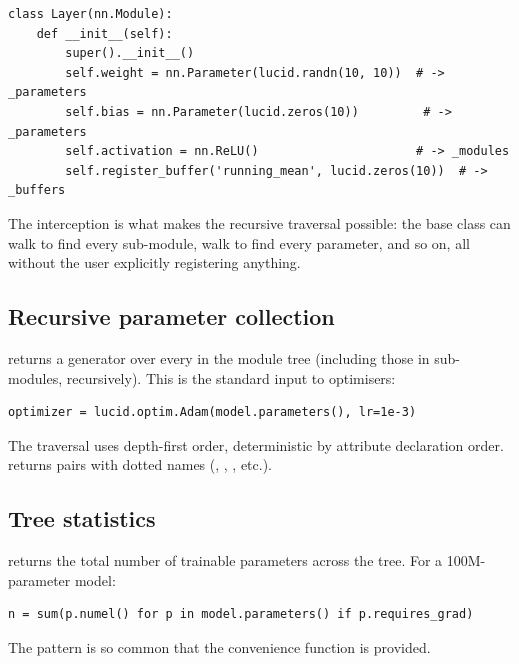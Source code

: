 \begin{lstlisting}[style=lucid,language=LucidPython]
class Layer(nn.Module):
    def __init__(self):
        super().__init__()
        self.weight = nn.Parameter(lucid.randn(10, 10))  # -> _parameters
        self.bias = nn.Parameter(lucid.zeros(10))         # -> _parameters
        self.activation = nn.ReLU()                      # -> _modules
        self.register_buffer('running_mean', lucid.zeros(10))  # -> _buffers
\end{lstlisting}

The interception is what makes the recursive traversal possible:
the base class can walk  to find every sub-module,
walk  to find every parameter, and so on, all
without the user explicitly registering anything.

\subsection{Recursive parameter collection}
\label{ssec:module_system:recursive_params}

 returns a generator over every
 in the module tree (including those in sub-modules,
recursively). This is the standard input to optimisers:

\begin{lstlisting}[style=lucid,language=LucidPython]
optimizer = lucid.optim.Adam(model.parameters(), lr=1e-3)
\end{lstlisting}

The traversal uses depth-first order, deterministic by attribute
declaration order.  returns
 pairs with dotted names
(, , , etc.).

\subsection{Tree statistics}
\label{ssec:module_system:tree_stats}

 returns the total number of
trainable parameters across the tree. For a 100M-parameter model:

\begin{lstlisting}[style=lucid,language=LucidPython]
n = sum(p.numel() for p in model.parameters() if p.requires_grad)
\end{lstlisting}

The pattern is so common that the convenience function
 is provided.

